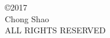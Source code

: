 
\begin{center}
\begin{singlespace}
\copyright 2017\\
Chong Shao \\
ALL RIGHTS RESERVED
\end{singlespace}
\end{center}

\clearpage
